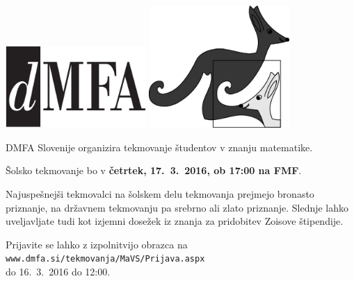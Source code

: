 \documentclass[oneside, 12pt]{article}
\title{\Title}
\author{\Author}
\date{\today}
\theoremstyle{definition}
\begin{document}
\begin{flushleft}
\includegraphics[width=0.4\textwidth]{LogoDMFA_Mono.pdf}
\hfill
\includegraphics[width=0.4\textwidth]{logo_kangaroo.jpg}
\end{flushleft}

\setlength{\parskip}{40pt}
\fontsize{38}{40}\selectfont
DMFA Slovenije organizira tekmovanje študentov v znanju matematike.

Šolsko
tekmovanje bo v \textbf{četrtek, 17.\ 3.\ 2016, ob 17:00 na FMF}.

Najuspešnejši tekmovalci na šolskem delu tekmovanja prejmejo
bronasto priznanje, na državnem tekmovanju pa srebrno ali zlato priznanje.
Slednje lahko uveljavljate
tudi kot izjemni dosežek iz znanja za pridobitev Zoisove štipendije.

Prijavite se lahko z izpolnitvijo obrazca na \\
\texttt{www.dmfa.si/tekmovanja/MaVS/Prijava.aspx} \\
do 16.\ 3.\ 2016 do 12:00.
\begin{center}
\end{center}
\end{document}
